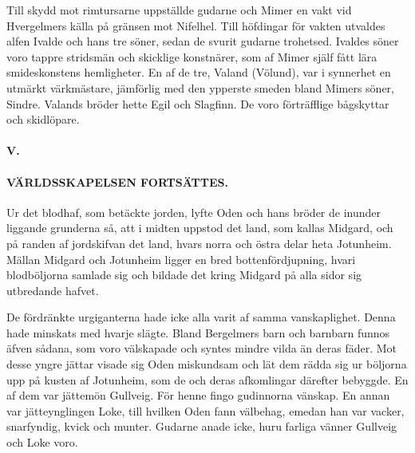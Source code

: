Till skydd mot rimtursarne uppställde gudarne och Mimer en vakt vid
Hvergelmers källa på gränsen mot Nifelhel. Till höfdingar för vakten
utvaldes alfen Ivalde och hans tre söner, sedan de svurit gudarne
trohetsed. Ivaldes söner voro tappre stridsmän och skicklige konstnärer,
som af Mimer själf fått lära smideskonstens hemligheter. En af de tre,
Valand (Völund), var i synnerhet en utmärkt värkmästare, jämförlig
\protect\hypertarget{lb1625905.xhtmlux5cux23start8}{}{}\protect\hypertarget{lb1625905.xhtmlux5cux23start8-a}{}{}\protect\hypertarget{lb1625905.xhtmlux5cux23start8-b}{}{}\protect\hypertarget{lb1625905.xhtmlux5cux23start8-c}{}{}\protect\hypertarget{lb1625905.xhtmlux5cux23start8-d}{}{}
med den ypperste smeden bland Mimers söner, Sindre. Valands bröder hette
Egil och Slagfinn. De voro förträfflige bågskyttar och skidlöpare.

\paragraph{V.}

\paragraph{VÄRLDSSKAPELSEN FORTSÄTTES.}

Ur det blodhaf, som betäckte jorden, lyfte Oden och hans bröder de
inunder liggande grunderna så, att i midten uppstod det land, som kallas
Midgard, och på randen af jordskifvan det land, hvars norra och östra
delar heta Jotunheim. Mällan Midgard och Jotunheim ligger en bred
bottenfördjupning, hvari blodböljorna samlade sig och bildade det kring
Midgard på alla sidor sig utbredande hafvet.

De fördränkte urgiganterna hade icke alla varit af samma vanskaplighet.
Denna hade minskats med hvarje slägte. Bland Bergelmers barn och
barnbarn funnos äfven sådana, som voro välskapade och syntes mindre
vilda än deras fäder. Mot desse yngre jättar visade sig Oden miskundsam
och lät dem rädda sig ur böljorna upp på kusten af Jotunheim, som de och
deras afkomlingar därefter bebyggde. En af dem var jättemön Gullveig.
För henne fingo gudinnorna vänskap. En annan var jätteynglingen Loke,
till hvilken Oden fann välbehag, emedan han var vacker, snarfyndig,
kvick och munter. Gudarne anade icke, huru farliga vänner Gullveig och
Loke voro.

